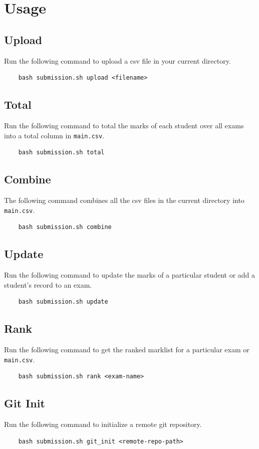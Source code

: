\documentclass{article}
\begin{document}
\section{Usage}
\subsection{Upload}
Run the following command to upload a csv file in your current directory.
\begin{verbatim}
    bash submission.sh upload <filename>
\end{verbatim}


\subsection{Total}
Run the following command to total the marks of each student over all exams into a total column in \verb"main.csv".
\begin{Verbatim}
    bash submission.sh total
\end{Verbatim}


\subsection{Combine}
The following command combines all the csv files in the current directory into \verb"main.csv".
\begin{Verbatim}
    bash submission.sh combine
\end{Verbatim}


\subsection{Update}
Run the following command to update the marks of a particular student or add a student's record to an exam.
\begin{verbatim}
    bash submission.sh update
\end{verbatim}

\subsection{Rank}
Run the following command to get the ranked marklist for a particular exam or \verb"main.csv".
\begin{verbatim}
    bash submission.sh rank <exam-name>
\end{verbatim}

\subsection{Git Init}
Run the following command to initialize a remote git repository.
\begin{verbatim}
    bash submission.sh git_init <remote-repo-path>
\end{verbatim}
\end{document}
